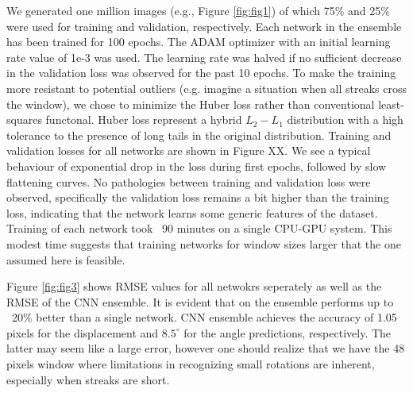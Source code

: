 \documentclass{svjour3}                     %
\begin{document}
We generated one million images (e.g., Figure \ref{fig:fig1}) of which 75\% and 25\% were used for training and validation, respectively. Each network in the ensemble has been trained for 100 epochs. The ADAM optimizer with an initial learning rate value of 1e-3 was used. The learning rate was halved if no sufficient decrease in the validation loss was observed for the past 10 epochs. To make the training more resistant to potential outliers (e.g. imagine a situation when all streaks cross the window), we chose to minimize the Huber loss \cite{} rather than conventional least-squares functonal. Huber loss represent a hybrid $L_2-L_1$ distribution with a high tolerance to the presence of long tails in the original distribution. 
Training and validation losses for all networks are shown in Figure XX. We see a typical behaviour of exponential drop in the loss during first epochs, followed by slow flattening curves. No pathologies between training and validation loss were observed, specifically the validation loss remains a bit higher than the training loss, indicating that the network learns some generic features of the dataset. Training of each network took ~90 minutes on a single CPU-GPU system. This modest time suggests that training networks for window sizes larger that the one assumed here is feasible. 

Figure \ref{fig:fig3} shows RMSE values for all netwokrs seperately as well as the RMSE of the CNN ensemble. It is evident that on the ensemble performs up to ~20\% better than a single network. CNN ensemble achieves the accuracy of 1.05 pixels for the displacement and $8.5^{\circ}$ for the angle predictions, respectively. The latter may seem like a large error, however one should realize that we have the 48 pixels window where limitations in recognizing small rotations are inherent, especially when streaks are short. 
\end{document}
